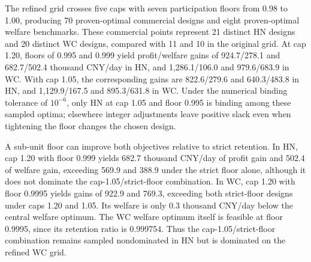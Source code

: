 The refined grid crosses five caps with seven participation floors from 0.98 to 1.00, producing 70 proven-optimal commercial designs and eight proven-optimal welfare benchmarks. These commercial points represent 21 distinct HN designs and 20 distinct WC designs, compared with 11 and 10 in the original grid. At cap 1.20, floors of 0.995 and 0.999 yield profit/welfare gains of 924.7/278.1 and 682.7/502.4 thousand CNY/day in HN, and 1,286.1/106.0 and 979.6/683.9 in WC. With cap 1.05, the corresponding gains are 822.6/279.6 and 640.3/483.8 in HN, and 1,129.9/167.5 and 895.3/631.8 in WC. Under the numerical binding tolerance of $10^{-6}$, only HN at cap 1.05 and floor 0.995 is binding among these sampled optima; elsewhere integer adjustments leave positive slack even when tightening the floor changes the chosen design.

A sub-unit floor can improve both objectives relative to strict retention. In HN, cap 1.20 with floor 0.999 yields 682.7 thousand CNY/day of profit gain and 502.4 of welfare gain, exceeding 569.9 and 388.9 under the strict floor alone, although it does not dominate the cap-1.05/strict-floor combination. In WC, cap 1.20 with floor 0.9995 yields gains of 922.9 and 769.3, exceeding both strict-floor designs under caps 1.20 and 1.05. Its welfare is only 0.3 thousand CNY/day below the central welfare optimum. The WC welfare optimum itself is feasible at floor 0.9995, since its retention ratio is 0.999754. Thus the cap-1.05/strict-floor combination remains sampled nondominated in HN but is dominated on the refined WC grid.
